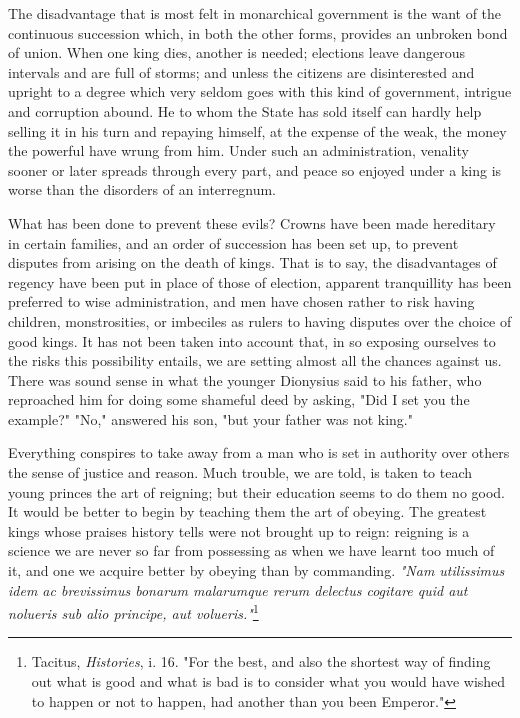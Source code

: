 \documentclass[12pt]{report}
\begin{document}
The disadvantage that is most felt in monarchical government is the want of the continuous succession which, in both the other forms, provides an unbroken bond of union. When one king dies, another is needed; elections leave dangerous intervals and are full of storms; and unless the citizens are disinterested and upright to a degree which very seldom goes with this kind of government, intrigue and corruption abound. He to whom the State has sold itself can hardly help selling it in his turn and repaying himself, at the expense of the weak, the money the powerful have wrung from him. Under such an administration, venality sooner or later spreads through every part, and peace so enjoyed under a king is worse than the disorders of an interregnum.

What has been done to prevent these evils? Crowns have been made hereditary in certain families, and an order of succession has been set up, to prevent disputes from arising on the death of kings. That is to say, the disadvantages of regency have been put in place of those of election, apparent tranquillity has been preferred to wise administration, and men have chosen rather to risk having children, monstrosities, or imbeciles as rulers to having disputes over the choice of good kings. It has not been taken into account that, in so exposing ourselves to the risks this possibility entails, we are setting almost all the chances against us. There was sound sense in what the younger Dionysius said to his father, who reproached him for doing some shameful deed by asking, "Did I set you the example?" "No," answered his son, "but your father was not king."

Everything conspires to take away from a man who is set in authority over others the sense of justice and reason. Much trouble, we are told, is taken to teach young princes the art of reigning; but their education seems to do them no good. It would be better to begin by teaching them the art of obeying. The greatest kings whose praises history tells were not brought up to reign: reigning is a science we are never so far from possessing as when we have learnt too much of it, and one we acquire better by obeying than by commanding. \textit{"Nam utilissimus idem ac brevissimus bonarum malarumque rerum delectus cogitare quid aut nolueris sub alio principe, aut volueris."}\footnote{Tacitus, \textit{Histories}, i. 16. "For the best, and also the shortest way of finding out what is good and what is bad is to consider what you would have wished to happen or not to happen, had another than you been Emperor."}
\end{document}

